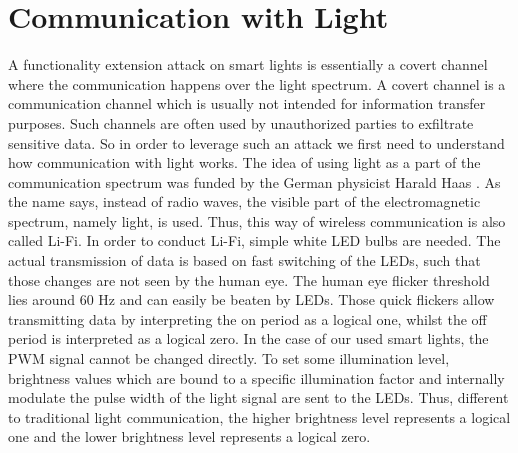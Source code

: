 \section{Communication with Light}
\label{sec:light_communication}


A functionality extension attack on smart lights is essentially a covert channel where the communication happens over the light spectrum. A covert channel is a communication channel which is usually not intended for information transfer purposes. Such channels are often used by unauthorized parties to exfiltrate sensitive data. So in order to leverage such an attack we first need to understand how communication with light works.\newline %
The idea of using light as a part of the communication spectrum was funded by the German physicist Harald Haas \cite{Haas:2016:WiL}. As the name says, instead of radio waves, the visible part of the electromagnetic spectrum, namely light, is used. Thus, this way of wireless communication is also called Li-Fi.
In order to conduct Li-Fi, simple white LED bulbs are needed. The actual transmission of data is based on fast switching of the LEDs, such that those changes are not seen by the human eye. The human eye flicker threshold lies around 60 Hz and can easily be beaten by LEDs. Those quick flickers allow transmitting data by interpreting the on period as a logical one, whilst the off period is interpreted as a logical zero.\newline
In the case of our used smart lights, the PWM signal cannot be changed directly. To set some illumination level, brightness values which are bound to a specific illumination factor and internally modulate the pulse width of the light signal are sent to the LEDs. Thus, different to traditional light communication, the higher brightness level represents a logical one and the lower brightness level represents a logical zero.